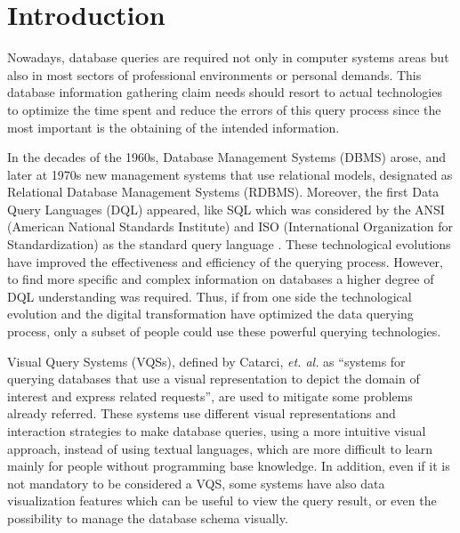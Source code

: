 \newcommand{\novathesis}{\emph{novathesis}}
\newcommand{\novathesisclass}{\texttt{novathesis.cls}}


\chapter{Introduction}
\label{cha:introduction}
Nowadays, database queries are required not only in computer systems areas but also in most sectors of professional environments or personal demands. This database information gathering claim needs should resort to actual technologies to optimize the time spent and reduce the errors of this query process since the most important is the obtaining of the intended information.

In the decades of the 1960s, Database Management Systems (DBMS) arose, and later at 1970s new management systems that use relational models, designated as Relational Database Management Systems (RDBMS). Moreover, the first Data Query Languages (DQL) appeared, like SQL \cite{sequel_aStructuredEnglishQueryLanguage} which was considered by the ANSI (American National Standards Institute) and ISO (International Organization for Standardization) as the standard query language \cite{databaseManagementSystems}. These technological evolutions have improved the effectiveness and efficiency of the querying process. However, to find more specific and complex information on databases a higher degree of DQL understanding was required. Thus, if from one side the technological evolution and the digital transformation have optimized the data querying process, only a subset of people could use these powerful querying technologies.

Visual Query Systems (VQSs), defined by Catarci, \textit{et. al.} \cite{visualQuerySystemsForDatabases_aSurvey} as “systems for querying databases that use a visual representation to depict the domain of interest and express related requests”, are used to mitigate some problems already referred. These systems use different visual representations and interaction strategies to make database queries, using a more intuitive visual approach, instead of using textual languages, which are more difficult to learn mainly for people without programming base knowledge. In addition, even if it is not mandatory to be considered a VQS, some systems have also data visualization features which can be useful to view the query result, or even the possibility to manage the database schema visually.

